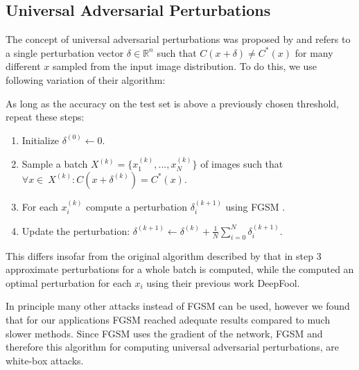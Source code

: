 \subsection{Universal Adversarial Perturbations}

The concept of universal adversarial perturbations was proposed by \citet{universal} and refers to a single perturbation vector $\delta \in \mathbb{R}^n$ such that $C(x + \delta) \neq C^*(x)$ for many different $x$ sampled from the input image distribution.
To do this, we use following variation of their algorithm:

As long as the accuracy on the test set is above a previously chosen threshold, repeat these steps:
\begin{enumerate}
	\item Initialize $\delta^{(0)} \gets 0$.
	\item Sample a batch $X^{(k)} = \{x_1^{(k)}, ..., x_N^{(k)}\}$ of images such that $\forall x \in\ X^{(k)}:C(x + \delta^{(k)}) = C^*(x)$.
	\item For each $x_i^{(k)}$ compute a perturbation $\delta_i^{(k+1)}$ using FGSM \citep{fgsm}.
	\item Update the perturbation: $\delta^{(k+1)} \gets \delta^{(k)} + \frac{1}{N} \sum\limits_{i=0}^N \delta_i^{(k+1)}$.
\end{enumerate}

This differs insofar from the original algorithm described by \citet{universal} that in step 3 approximate perturbations for a whole batch is computed, while the computed an optimal perturbation for each $x_i$ using their previous work DeepFool.

In principle many other attacks instead of FGSM can be used, however we found that for our applications FGSM reached adequate results compared to much slower methods.
Since FGSM uses the gradient of the network, FGSM and therefore this algorithm for computing universal adversarial perturbations, are white-box attacks.

